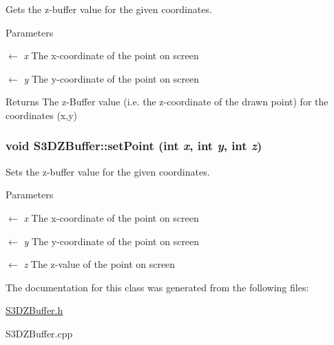 Gets the z-\/buffer value for the given coordinates. 


\begin{DoxyParams}{Parameters}
\item[\mbox{$\leftarrow$} {\em x}]The x-\/coordinate of the point on screen \item[\mbox{$\leftarrow$} {\em y}]The y-\/coordinate of the point on screen \end{DoxyParams}
\begin{DoxyReturn}{Returns}
The z-\/Buffer value (i.e. the z-\/coordinate of the drawn point) for the coordinates (x,y) 
\end{DoxyReturn}
\hypertarget{class_s3_d_z_buffer_aa712e633bf2ccf4c43bb27178a1692c1}{
\subsubsection[{setPoint}]{\setlength{\rightskip}{0pt plus 5cm}void S3DZBuffer::setPoint (int {\em x}, \/  int {\em y}, \/  int {\em z})}}
\label{class_s3_d_z_buffer_aa712e633bf2ccf4c43bb27178a1692c1}


Sets the z-\/buffer value for the given coordinates. 


\begin{DoxyParams}{Parameters}
\item[\mbox{$\leftarrow$} {\em x}]The x-\/coordinate of the point on screen \item[\mbox{$\leftarrow$} {\em y}]The y-\/coordinate of the point on screen \item[\mbox{$\leftarrow$} {\em z}]The z-\/value of the point on screen \end{DoxyParams}


The documentation for this class was generated from the following files:\begin{DoxyCompactItemize}
\item 
\hyperlink{_s3_d_z_buffer_8h}{S3DZBuffer.h}\item 
S3DZBuffer.cpp\end{DoxyCompactItemize}
